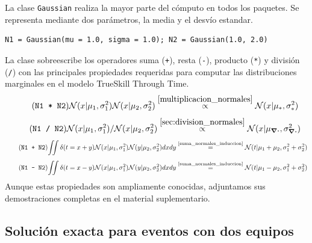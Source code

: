 \documentclass[a4paper,11pt]{book}
\newcommand{\N}{\mathcal{N}}
\theoremstyle{definition}
\begin{document}
La clase \texttt{Gaussian} realiza la mayor parte del c\'omputo en todos los paquetes.
%
Se representa mediante dos par\'ametros, la media y el desv\'io estandar.
\begin{lstlisting}[captionpos=b,backgroundcolor=\color{all},label=lst:N1_N2, caption={Inicializaci\'on de distribuciones gaussianas}, belowskip=0cm]
N1 = Gaussian(mu = 1.0, sigma = 1.0); N2 = Gaussian(1.0, 2.0)
\end{lstlisting}
%
La clase sobreescribe los operadores suma (\texttt{+}), resta (\texttt{-}), producto (\texttt{*}) y divisi\'on (\texttt{/}) con las principales propiedades requeridas para computar las distribuciones marginales en el modelo TrueSkill Through Time.
%
\begin{equation*} \tag{\texttt{N1 * N2}}
 \N(x|\mu_1,\sigma_1^2)\N(x|\mu_2,\sigma_2^2) \overset{\ref{multiplicacion_normales}}{\propto} \N(x|\mu_{*},\sigma_{*}^2)
\end{equation*}
%
\begin{equation*} \tag{\texttt{N1 / N2}}
 \N(x|\mu_1,\sigma_1^2)/\N(x|\mu_2,\sigma_2^2)  \overset{\ref{sec:division_normales}}{\propto} \N(x|\mu_{\div},\sigma_{\div}^2)
\end{equation*}
%
\vspace{-0.3cm}
%
\begin{equation*} \tag{\texttt{N1 + N2}} \label{eq:suma_normales}
\begin{split}
\iint \delta(t=x + y) \N(x|\mu_1, \sigma_1^2)\N(y|\mu_2, \sigma_2^2) dxdy \overset{\text{\ref{suma_normales_induccion}}}{=} \N(t|\mu_1+\mu_2,\sigma_1^2 + \sigma_2^2)
\end{split}
\end{equation*}
%
\vspace{-0.5cm}
%
\begin{equation*} \tag{\texttt{N1 - N2}} \label{eq:resta_normales}
\begin{split}
\iint \delta(t = x - y) \N(x|\mu_1, \sigma_1^2)\N(y|\mu_2, \sigma_2^2) dxdy \overset{\text{\ref{suma_normales_induccion}}}{=} \N(t|\mu_1 - \mu_2,\sigma_1^2 + \sigma_2^2)
\end{split}
\end{equation*}
%
Aunque estas propiedades son ampliamente conocidas, adjuntamos sus demostraciones completas en el material suplementario.

\subsection{Soluci\'on exacta para eventos con dos equipos}\label{sec:2vs2}
\end{document}
